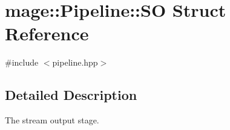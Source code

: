 \hypertarget{structmage_1_1_pipeline_1_1_s_o}{}\section{mage\+:\+:Pipeline\+:\+:SO Struct Reference}
\label{structmage_1_1_pipeline_1_1_s_o}


{\ttfamily \#include $<$pipeline.\+hpp$>$}



\subsection{Detailed Description}
The stream output stage. 